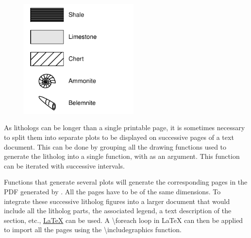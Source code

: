 \begin{figure}[H]
	\centering
	\includegraphics[width=60mm]{legend.log}
\end{figure}

As lithologs can be longer than a single printable page, it is sometimes necessary to split them into separate plots to be displayed on successive pages of a text document. This can be done by grouping all the drawing functions used to generate the litholog into a single function, with  as an argument. This function can be iterated with successive  intervals.

Functions that generate several plots will generate the corresponding pages in the PDF generated by . All the pages have to be of the same dimensions. To integrate these successive litholog figures into a larger document that would include all the litholog parts, the associated legend, a text description of the section, etc., \href{https://www.latex-project.org/}{LaTeX} can be used. A \textbackslash foreach loop in LaTeX can then be applied to import all the pages using the \textbackslash includegraphics function.

